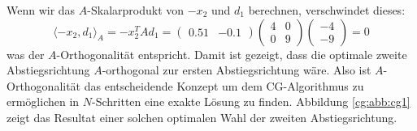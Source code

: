 Wenn wir das $A$-Skalarprodukt von $-x_2$ und $d_1$ berechnen, verschwindet dieses:
\begin{equation}
	\langle -x_2 , d_1 \rangle_A = 	-x_2^T A d_1 = 
		\begin{pmatrix} 0.51 & -0.1 \end{pmatrix} 
		\begin{pmatrix} 4 & 0\\
						0 & 9 
		\end{pmatrix} 
		\begin{pmatrix} -4\\
						-9 
		\end{pmatrix} = 0 \nonumber
\end{equation}
was der $A$-Orthogonalität entspricht.
Damit ist gezeigt, dass die optimale zweite Abstiegsrichtung $A$-orthogonal zur ersten Abstiegsrichtung wäre.
Also ist $A$-Orthogonalität das entscheidende Konzept um dem CG-Algorithmus zu ermöglichen in $N$-Schritten eine exakte Lösung zu finden.
Abbildung \ref{cg:abb:cg1} zeigt das Resultat einer solchen optimalen Wahl der zweiten Abstiegsrichtung.